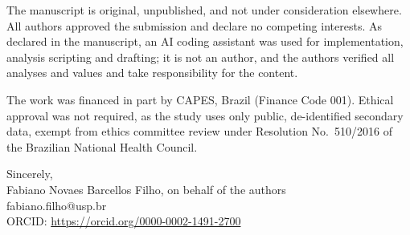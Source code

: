 \documentclass[11pt]{article}
\begin{document}
The manuscript is original, unpublished, and not under consideration elsewhere. All authors
approved the submission and declare no competing interests. As declared in the manuscript,
an AI coding assistant was used for implementation, analysis scripting and drafting; it is
not an author, and the authors verified all analyses and values and take responsibility for
the content.

The work was financed in part by CAPES, Brazil (Finance Code 001). Ethical approval was not required, as the study uses
only public, de-identified secondary data, exempt from ethics committee review under
Resolution No.~510/2016 of the Brazilian National Health Council.

\vspace{0.8em}

\noindent Sincerely, \\[0.6em]
Fabiano Novaes Barcellos Filho, on behalf of the authors \\
fabiano.filho@usp.br \\
ORCID: \url{https://orcid.org/0000-0002-1491-2700}
\end{document}
